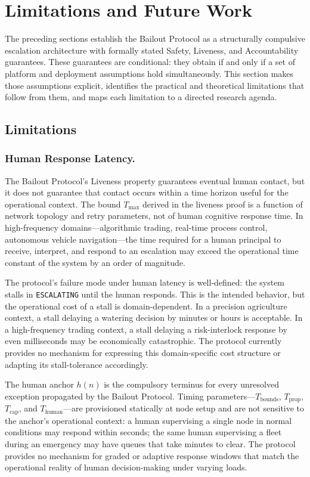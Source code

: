 \section{Limitations and Future Work}
\label{sec:limitations}

The preceding sections establish the Bailout Protocol as a structurally compulsive escalation architecture with formally stated Safety, Liveness, and Accountability guarantees. These guarantees are conditional: they obtain if and only if a set of platform and deployment assumptions hold simultaneously. This section makes those assumptions explicit, identifies the practical and theoretical limitations that follow from them, and maps each limitation to a directed research agenda.

\subsection{Limitations}

\subsubsection{Human Response Latency.}
The Bailout Protocol's Liveness property guarantees eventual human contact, but it does not guarantee that contact occurs within a time horizon useful for the operational context. The bound $T_{\max}$ derived in the liveness proof is a function of network topology and retry parameters, not of human cognitive response time. In high-frequency domains---algorithmic trading, real-time process control, autonomous vehicle navigation---the time required for a human principal to receive, interpret, and respond to an escalation may exceed the operational time constant of the system by an order of magnitude.

The protocol's failure mode under human latency is well-defined: the system stalls in \texttt{ESCALATING} until the human responds. This is the intended behavior, but the operational cost of a stall is domain-dependent. In a precision agriculture context, a stall delaying a watering decision by minutes or hours is acceptable. In a high-frequency trading context, a stall delaying a risk-interlock response by even milliseconds may be economically catastrophic. The protocol currently provides no mechanism for expressing this domain-specific cost structure or adapting its stall-tolerance accordingly.

The human anchor $h(n)$ is the compulsory terminus for every unresolved exception propagated by the Bailout Protocol. Timing parameters---$T_{\mathrm{bounds}}$, $T_{\mathrm{prop}}$, $T_{\mathrm{cap}}$, and $T_{\mathrm{human}}$---are provisioned statically at node setup and are not sensitive to the anchor's operational context: a human supervising a single node in normal conditions may respond within seconds; the same human supervising a fleet during an emergency may have queues that take minutes to clear. The protocol provides no mechanism for graded or adaptive response windows that match the operational reality of human decision-making under varying loads.


